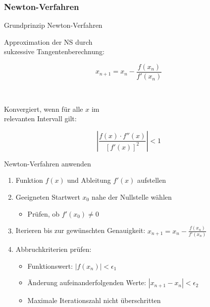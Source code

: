 \subsubsection{Newton-Verfahren}

\begin{concept}{Grundprinzip Newton-Verfahren}
    \vspace{-2mm}\\
\begin{minipage}[t]{0.6\textwidth}
    Approximation der NS durch \\ sukzessive Tangentenberechnung:
\end{minipage}
\begin{minipage}{0.3\textwidth}
    \vspace{-3mm}
    $$x_{n+1} = x_n - \frac{f(x_n)}{f'(x_n)}$$
\end{minipage}
\vspace{-2mm}\\
\begin{minipage}[t]{0.6\textwidth}
    Konvergiert, wenn für alle $x$ im \\ relevanten Intervall gilt:
\end{minipage}
\begin{minipage}{0.3\textwidth}
    \vspace{-3mm}
    $$\left|\frac{f(x) \cdot f''(x)}{[f'(x)]^2}\right| < 1$$
\end{minipage}
\end{concept}

\begin{KR}{Newton-Verfahren anwenden}
\begin{enumerate}
    \item Funktion $f(x)$ und Ableitung $f'(x)$ aufstellen
    \item Geeigneten Startwert $x_0$ nahe der Nullstelle wählen
    \begin{itemize}
        \item Prüfen, ob $f'(x_0) \neq 0$
    \end{itemize}
    \item Iterieren bis zur gewünschten Genauigkeit:
    $x_{n+1} = x_n - \frac{f(x_n)}{f'(x_n)}$
    \item Abbruchkriterien prüfen:
    \begin{itemize}
        \item Funktionswert: $|f(x_n)| < \epsilon_1$
        \item Änderung aufeinanderfolgenden Werte: $|x_{n+1}-x_n| < \epsilon_2$
        \item Maximale Iterationszahl nicht überschritten
    \end{itemize}
\end{enumerate}
\end{KR}

